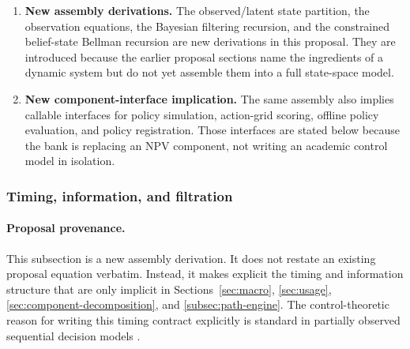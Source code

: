 \documentclass[11pt]{article}
\newcommand{\1}{\mathbf{1}}
\begin{document}
\begin{enumerate}[label=\arabic*.]
        downstream-policy logic follow Section~\ref{subsec:interdependent-decisions}
        and Equations~\eqref{eq:dynamic-policy-system} and
        \eqref{eq:policy-value}.
  \item \textbf{New assembly derivations.} The observed/latent state partition,
        the observation equations, the Bayesian filtering recursion, and the
        constrained belief-state Bellman recursion are new derivations in this
        proposal. They are introduced because the earlier proposal sections name
        the ingredients of a dynamic system but do not yet assemble them into a
        full state-space model.
  \item \textbf{New component-interface implication.} The same assembly also
        implies callable interfaces for policy simulation, action-grid scoring,
        offline policy evaluation, and policy registration. Those interfaces are
        stated below because the bank is replacing an NPV component, not writing
        an academic control model in isolation.
\end{enumerate}

\subsubsection{Timing, information, and filtration}
\label{subsec:state-space-timing}

\paragraph{Proposal provenance.}
This subsection is a new assembly derivation. It does not restate an existing
proposal equation verbatim. Instead, it makes explicit the timing and
information structure that are only implicit in Sections~\ref{sec:macro},
\ref{sec:usage}, \ref{sec:component-decomposition}, and
\ref{subsec:path-engine}. The control-theoretic reason for writing this timing
contract explicitly is standard in partially observed sequential decision models
\citep{smallwood1973pomdp,kaelbling1998pomdp}.
\end{document}

